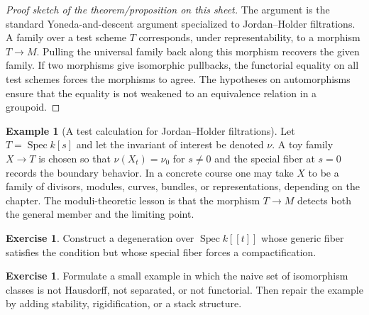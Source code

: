 \documentclass[11pt]{amsart}
\theoremstyle{definition}
\newtheorem{example}[theorem]{Example}
\newtheorem{exercise}[theorem]{Exercise}
\newcommand{\Spec}{\operatorname{Spec}}
\begin{document}
\begin{proof}[Proof sketch of the theorem/proposition on this sheet]
The argument is the standard Yoneda-and-descent argument specialized to Jordan--Holder filtrations.  A family over a test scheme $T$ corresponds, under representability, to a morphism $T\to M$.  Pulling the universal family back along this morphism recovers the given family.  If two morphisms give isomorphic pullbacks, the functorial equality on all test schemes forces the morphisms to agree.  The hypotheses on automorphisms ensure that the equality is not weakened to an equivalence relation in a groupoid.
\end{proof}
\begin{example}[A test calculation for Jordan--Holder filtrations]
Let $T=\Spec k[s]$ and let the invariant of interest be denoted $\nu$.  A toy family $X\to T$ is chosen so that $\nu(X_t)=\nu_0$ for $s\ne0$ and the special fiber at $s=0$ records the boundary behavior.  In a concrete course one may take $X$ to be a family of divisors, modules, curves, bundles, or representations, depending on the chapter.  The moduli-theoretic lesson is that the morphism $T\to M$ detects both the general member and the limiting point.
\end{example}
\begin{exercise}
Construct a degeneration over $\Spec k[[t]]$ whose generic fiber satisfies the condition but whose special fiber forces a compactification.
\end{exercise}
\begin{exercise}
Formulate a small example in which the naive set of isomorphism classes is not Hausdorff, not separated, or not functorial.  Then repair the example by adding stability, rigidification, or a stack structure.
\end{exercise}
\clearpage
\end{document}

